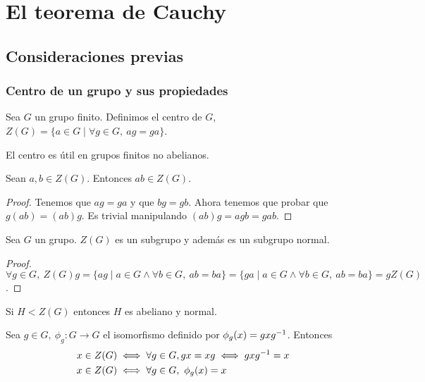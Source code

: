 
\chapter{El teorema de Cauchy}

\section{Consideraciones previas}

\subsection{Centro de un grupo y sus propiedades}

\begin{dfn}
	Sea $G$ un grupo finito. Definimos el centro de $G$, $Z(G) = \{a \in G \mid \forall g \in G,\ ag = ga\}$.
\end{dfn}

El centro es útil en grupos finitos no abelianos.

\begin{pro}
	Sean $a, b \in Z(G)$. Entonces $ab \in Z(G)$.
\end{pro}

\begin{proof}
	Tenemos que $ag = ga$ y que $bg = gb$. Ahora tenemos que probar que $g(ab) = (ab)g$. Es trivial manipulando $(ab)g = agb = gab$.
\end{proof}

\begin{pro}
	Sea $G$ un grupo. $Z(G)$ es un subgrupo y además es un subgrupo normal.
\end{pro}

\begin{proof}
	$\forall g \in G,\ Z(G)g = \{ag \mid a \in G \land \forall b \in G,\ ab = ba\} = \{ga \mid a \in G \land \forall b \in G,\ ab = ba\} = gZ(G)$.
\end{proof}

\begin{pro}
	Si $H < Z(G)$ entonces $H$ es abeliano y normal.
\end{pro}

\begin{pro}
	Sea $g \in G,\ \phi_g: G \to G$ el isomorfismo definido por $\phi_g(x) = gxg^{-1}$. Entonces
	\begin{align*}
	x \in Z(G) &\iff \forall g \in G, gx = xg \iff gxg^{-1} = x \\
	x \in Z(G) &\iff \forall g \in G,\ \phi_g(x) = x 
	\end{align*}
\end{pro}

